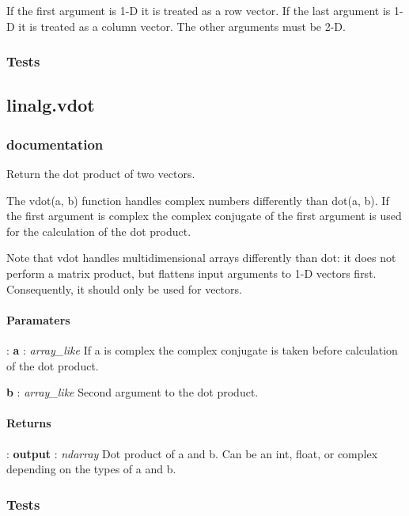 \documentclass[a4paper,11pt]{article}
\begin{document}
If the first argument is 1-D it is treated as a row vector. If the last argument is 1-D it is treated as a column vector. The other arguments must be 2-D.

\subsubsection{Tests}

\subsection{linalg.vdot}

\subsubsection{documentation}
Return the dot product of two vectors.

The vdot(a, b) function handles complex numbers differently than dot(a, b). If the first argument is complex the complex conjugate of the first argument is used for the calculation of the dot product.

Note that vdot handles multidimensional arrays differently than dot: it does not perform a matrix product, but flattens input arguments to 1-D vectors first. Consequently, it should only be used for vectors.

\paragraph{Paramaters}:	
\textbf{a} : \textit{array\_like} If a is complex the complex conjugate is taken before calculation of the dot product.

\indent \hspace{2.3cm}\textbf{b} : \textit{array\_like} Second argument to the dot product.

\paragraph{Returns}:	
\indent \hspace{0.1cm}\textbf{output} : \textit{ndarray} Dot product of a and b. Can be an int, float, or complex depending on the types of a and b.



\subsubsection{Tests}
\end{document}
